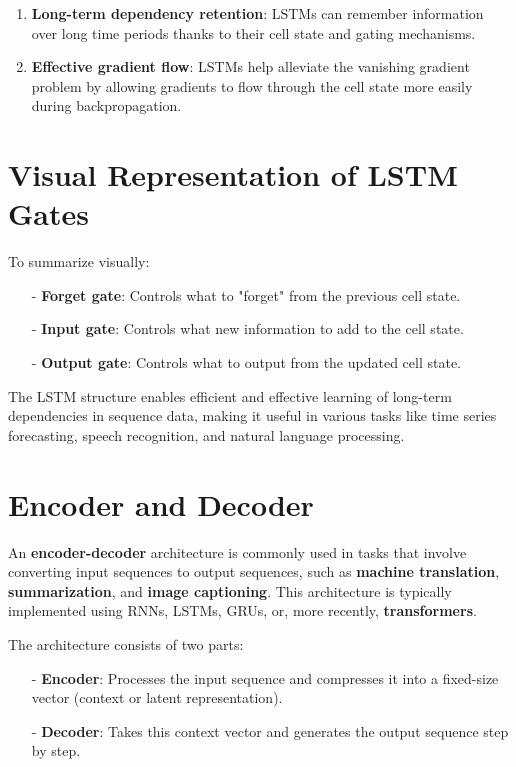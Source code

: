 \documentclass[10pt]{article}
\begin{document}
\begin{enumerate}
   \item {\bf Long-term dependency retention}: LSTMs can remember information over long time periods thanks to their cell state and gating mechanisms.
   \item {\bf Effective gradient flow}: LSTMs help alleviate the vanishing gradient problem by allowing gradients to flow through the cell state more easily during backpropagation.
\end{enumerate}

\section{ Visual Representation of LSTM Gates}

To summarize visually:

\begin{enumerate}
   \item [-] {\bf Forget gate}: Controls what to "forget" from the previous cell state.
   \item [-] {\bf Input gate}: Controls what new information to add to the cell state.
   \item [-] {\bf Output gate}: Controls what to output from the updated cell state.
\end{enumerate}

The LSTM structure enables efficient and effective learning of long-term dependencies in sequence data, making it useful in various tasks like time series forecasting, speech recognition, and natural language processing.




\section {Encoder and Decoder}


An {\bf encoder-decoder } architecture is commonly used in tasks that involve converting input sequences to output sequences, such as {\bf machine translation}, {\bf summarization}, and {\bf image captioning}. This architecture is typically implemented using RNNs, LSTMs, GRUs, or, more recently, {\bf transformers}.

The architecture consists of two parts:

\begin{enumerate}
   \item [-] {\bf Encoder}: Processes the input sequence and compresses it into a fixed-size vector (context or latent representation).
   \item [-] {\bf Decoder}: Takes this context vector and generates the output sequence step by step.
\end{enumerate}
\end{document}
